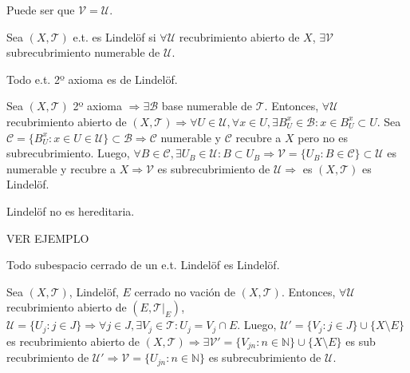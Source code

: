 \begin{obs}
  Puede ser que $ \mathcal{V} = \mathcal{U}$.
\end{obs}

\begin{defn}[Lindelöf]
  Sea $ ( X, \mathcal{T} )$ e.t. es Lindelöf si $\forall \mathcal{U}$ recubrimiento abierto de $X$, $\exists \mathcal{V}$ subrecubrimiento numerable de $\mathcal{U}$.
\end{defn}

\begin{prop}
  Todo e.t. 2º axioma es de Lindelöf.
\end{prop}

\begin{dem}
  Sea $( X, \mathcal{T} )$ 2º axioma $\Rightarrow \exists \mathcal{B}$ base numerable de $\mathcal{T}$. Entonces, $\forall \mathcal{U}$ recubrimiento abierto de $( X, \mathcal{T} ) \Rightarrow \forall U \in \mathcal{U}, \forall x \in U, \exists B_{U}^{x} \in \mathcal{B}: x \in B_{U}^{x} \subset U$. Sea $\mathcal{C} = \{ B_{U}^{x} : x \in U \in \mathcal{U}\}\subset \mathcal{B} \Rightarrow \mathcal{C}$ numerable y $\mathcal{C}$ recubre a $X$ pero no es subrecubrimiento. Luego, $\forall B \in \mathcal{C}, \exists U_{B} \in \mathcal{U} : B \subset U_{B} \Rightarrow \mathcal{V} = \{ U_{B} : B \in \mathcal{C} \} \subset \mathcal{U}$ es numerable y recubre a $X \Rightarrow \mathcal{V}$ es subrecubrimiento de $\mathcal{U} \Rightarrow $ es $( X, \mathcal{T} )$ es Lindelöf.
\end{dem}

\begin{obs}
  Lindelöf no es hereditaria.
\end{obs}

\begin{ejm}
  VER EJEMPLO
\end{ejm}

\begin{prop}
  Todo subespacio cerrado de un e.t. Lindelöf es Lindelöf.
\end{prop}

\begin{dem}
  Sea $( X, \mathcal{T} )$, Lindelöf, $E$ cerrado no vación de $( X, \mathcal{T} )$. Entonces, $\forall \mathcal{U}$ recubrimiento abierto de $( E, \mathcal{T}|_{E})$, $\mathcal{U} = \{  U_{j} : j \in J \} \Rightarrow \forall j \in J, \exists V_{j} \in \mathcal{T} : U_{j} = V_{j} \cap E$. Luego, $ \mathcal{U}' = \{ V_{j} : j \in J \} \cup \{ X \setminus E \}$ es recubrimiento abierto de $( X, \mathcal{T} ) \Rightarrow \exists \mathcal{V}' = \{ V_{jn} : n \in \mathbb{N} \} \cup \{ X \setminus E \}$ es sub recubrimiento de $\mathcal{U}' \Rightarrow \mathcal{V} = \{  U_{jn} : n \in \mathbb{N} \}$ es subrecubrimiento de $\mathcal{U}$.
\end{dem}

